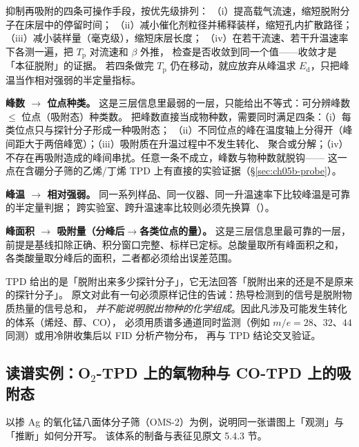 \begin{measure}
抑制再吸附的四条可操作手段，按优先级排列：
（i）提高载气流速，缩短脱附分子在床层中的停留时间；
（ii）减小催化剂粒径并稀释装样，缩短孔内扩散路径；
（iii）减小装样量（毫克级），缩短床层长度；
（iv）在若干流速、若干升温速率下各测一遍，把 $T_{\mathrm p}$ 对流速和 $\beta$ 外推，
检查是否收敛到同一个值——收敛才是「本征脱附」的证据。
若四条做完 $T_{\mathrm p}$ 仍在移动，就应放弃从峰温求 $E_{\mathrm d}$，只把峰温当作相对强弱的半定量指标。
\end{measure}

\begin{dataflow}
\textbf{峰数 $\to$ 位点种类。} 这是三层信息里最弱的一层，只能给出不等式：可分辨峰数 $\le$ 位点（吸附态）种类数。
把峰数直接当成物种数，需要同时满足四条：（i）每类位点只与探针分子形成一种吸附态；
（ii）不同位点的峰在温度轴上分得开（峰间距大于两倍峰宽）；（iii）吸附质在升温过程中不发生转化、
聚合或分解；（iv）不存在再吸附造成的峰间串扰。任意一条不成立，峰数与物种数就脱钩——
这一点在含硼分子筛的乙烯/丁烯 TPD 上有直接的实验证据（\S\ref{sec:ch05b-probe}）。

\textbf{峰温 $\to$ 相对强弱。} 同一系列样品、同一仪器、同一升温速率下比较峰温是可靠的半定量判据；
跨实验室、跨升温速率比较则必须先换算（）。

\textbf{峰面积 $\to$ 吸附量（分峰后$\to$各类位点的量）。} 这是三层信息里最可靠的一层，
前提是基线扣除正确、积分窗口完整、标样已定标。总酸量取所有峰面积之和，
各类酸量取分峰后的面积，二者都必须给出误差范围。
\end{dataflow}

\begin{crosscheck}
TPD 给出的是「脱附出来多少探针分子」，它无法回答「脱附出来的还是不是原来的探针分子」。
原文对此有一句必须原样记住的告诫：热导检测到的信号是脱附物质热量的信号总和，
\emph{并不能说明脱出物种的化学组成}。因此凡涉及可能发生转化的体系（烯烃、醇、CO），
必须用质谱多通道同时监测（例如 $m/e=28$、$32$、$44$ 同测）或用冷阱收集后以 FID 分析产物分布，
再与 TPD 结论交叉验证。
\end{crosscheck}

\subsection{读谱实例：\texorpdfstring{O$_2$}{O2}-TPD 上的氧物种与 CO-TPD 上的吸附态}
\label{sec:ch05b-example}

以掺 Ag 的氧化锰八面体分子筛（OMS-2）为例，说明同一张谱图上「观测」与「推断」如何分开写。
该体系的制备与表征见原文 5.4.3 节。

